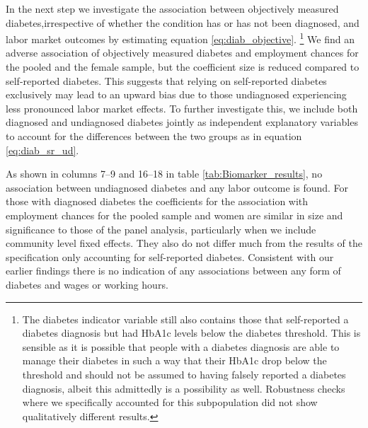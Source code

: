 \documentclass[12pt,english,british]{article}
\begin{document}
In the next step we investigate the association between objectively measured
diabetes,irrespective of whether
the condition has or has not been diagnosed, and labor market outcomes by estimating equation \ref{eq:diab_objective}. \footnote{The diabetes indicator
variable still also contains those that self-reported a diabetes diagnosis
but had \ac{HbA1c} levels below the diabetes threshold. This is sensible as it is possible that people with a diabetes diagnosis are able to manage their diabetes in such a way that their \ac{HbA1c} drop below the threshold and should not be assumed to having falsely reported a diabetes diagnosis, albeit this admittedly is a possibility as well. Robustness checks where we specifically accounted for this subpopulation
did not show qualitatively different results.}  We find an adverse association of objectively measured diabetes and employment
chances for the pooled and the female sample, but the coefficient size is reduced compared to self-reported diabetes. This suggests that relying on self-reported
diabetes exclusively may lead to an upward bias due to those undiagnosed experiencing less pronounced labor market effects.
To further investigate this, we include both diagnosed and undiagnosed diabetes jointly as independent explanatory variables to account for the differences between the two groups as in equation \ref{eq:diab_sr_ud}.

As shown in columns 7--9 and 16--18 in table \ref{tab:Biomarker_results}, no association between undiagnosed
diabetes and any labor outcome is found. For those with diagnosed
diabetes the coefficients for the association with employment chances
 for the pooled sample and women are similar in size and significance to those of the panel analysis, particularly when we include community level fixed effects. They also do not differ much from the results of the specification only accounting for self-reported diabetes. Consistent with our earlier findings there is no indication of any associations between any form of diabetes and wages or working hours. 
 
\end{document}
